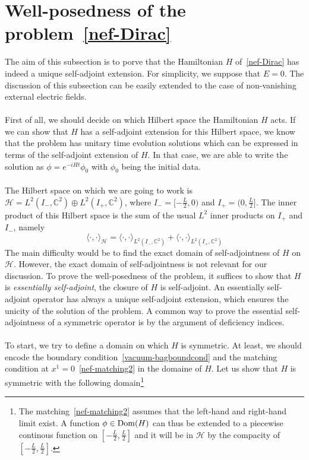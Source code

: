 \section{Well-posedness of the problem~\cref{nef-Dirac}}\label{vacuum-subsect-sa}
The aim of this subsection is to porve that the Hamiltonian $H$ of~\cref{nef-Dirac} has indeed a unique self-adjoint extension.
For simplicity, 
we suppose that $E = 0$.
The discussion of this subsection can be easily extended to the case of non-vanishing external electric fields.\\\\
First of all, we should decide on which Hilbert space the Hamiltonian $H$ acts.
If we can show that $H$ has a self-adjoint extension for this Hilbert space, 
we know that the problem has unitary time evolution solutions which can be expressed in terms of the self-adjoint extension of $H$.
In that case, we are able to write the solution as $\phi =  e^{-iHt}\phi_0$ with $\phi_0$ being the initial data.
\\\\
%
The Hilbert space on which we are going to work is $\mathcal{H} = L^{2}(I_-, \mathbb{C}^2) \oplus L^{2}(I_+, \mathbb{C}^2)$,  where $I_- = [-\frac{L}{2}, 0)$ and $I_+ = (0, \frac{L}{2}]$.
The inner product of this Hilbert space is the sum of the usual $L^2$ inner products on $I_+$ and $I_-$, namely
\begin{equation*}
\langle \cdot, \cdot\rangle_{\mathcal{H} } = \langle \cdot, \cdot\rangle_{L^{2}(I_-, \mathbb{C}^2)} +\langle \cdot, \cdot\rangle_{L^{2}(I_+, \mathbb{C}^2)}
\end{equation*}
The main difficulty would be to find the exact domain of self-adjointness of $H$ on $\mathcal{H}$.
However, the exact domain of self-adjointness is not relevant for our discussion.
To prove the well-posedness of the problem, it suffices to show that $H$ is \textit{essentially self-adjoint},
\ie the closure of $H$ is self-adjoint.
An essentially self-adjoint operator has always a unique self-adjoint extension, which ensures the unicity of the solution of the problem.
A common way to prove the essential self-adjointness of a symmetric operator is by the argument of deficiency indices.\\\\
%
To start, we try to define a domain on which $H$ is symmetric.
At least, we should encode the boundary condition~\cref{vacuum-bagboundcond} and the matching condition at $x^1 = 0$~\cref{nef-matching2} in the domaine of $H$.
Let us show that $H$ is symmetric with the following domain\footnote{
The matching~\cref{nef-matching2} assumes that the left-hand and right-hand limit exist. 
A function $\phi\in\mathrm{Dom}(H)$ can thus be extended to a piecewise continous function on $[-\frac L 2, \frac L 2]$ and it will be in $\mathcal{H}$ by the compacity of $[-\frac L 2, \frac L 2]$.
} 
